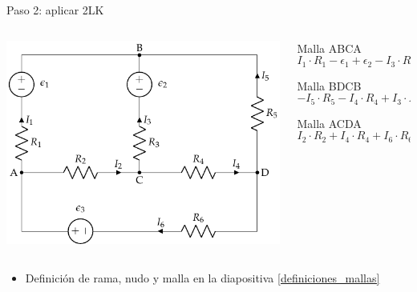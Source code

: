 \documentclass[aspectratio=169, xcolor={usenames,svgnames,dvipsnames}]{beamer}
\begin{document}
\begin{frame}{Paso 2: \hspace{3mm}aplicar 2LK}
    \begin{columns}
    \begin{column}{0.5\columnwidth}
    \begin{center}
    \includegraphics[width=.9\linewidth]{../figs/mallas1.pdf}
    \end{center}
    \end{column}
    
    \begin{column}{0.5\columnwidth}
    Malla ABCA
    \begin{equation*}
      I_1 \cdot R_1 - \epsilon_1 + \epsilon_2 - I_3 \cdot R_3 - I_2 \cdot R_2 = 0
    \end{equation*}
    
    Malla BDCB
    \begin{equation*}
      -I_5 \cdot R_5 - I_4 \cdot R_4 + I_3 \cdot R_3 - \epsilon_2 = 0
    \end{equation*}
    
    Malla ACDA
    \begin{equation*}
      I_2 \cdot R_2 + I_4 \cdot R_4 + I_6 \cdot R_6 - \epsilon_3 = 0
    \end{equation*}
    \end{column}
    \end{columns}

    \begin{center}
    \end{center}
    \vspace{-10pt} 
    \begin{itemize}\addtolength{\itemindent}{12mm}
        \item Definición de \alert{rama}, \alert{nudo} y \alert{malla} en la diapositiva \ref{definiciones_mallas}
    \end{itemize}
\end{frame}
\end{document}
